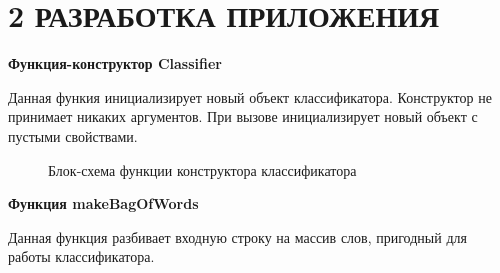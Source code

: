 \documentclass[14pt,a4paper]{extreport}
\begin{document}
	\section*{\normalsize\hspace{4ex}2 РАЗРАБОТКА ПРИЛОЖЕНИЯ}
    \par \small \textbf{Функция-конструктор Classifier}
    \\ \par Данная функия инициализирует новый объект классификатора. Конструктор не принимает никаких аргументов. При вызове инициализирует новый объект с пустыми свойствами.
    \begin{figure}[h]
    \caption{Блок-схема функции конструктора классификатора}
    \label{ris:image}
    \end{figure}
    \newpage \par \small \textbf{Функция makeBagOfWords}
    \\ \par Данная функция разбивает входную строку на массив слов, пригодный для работы классификатора.
\end{document}
